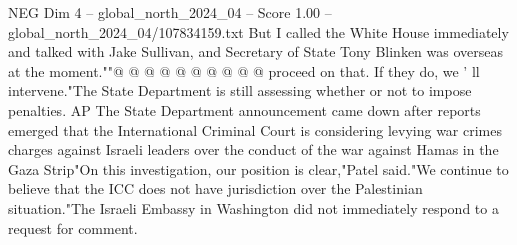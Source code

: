 \begin{textsample}{NEG Dim 4 – global\_north\_2024\_04 – Score 1.00 – global\_north\_2024\_04/107834159.txt}
But I called the White House immediately and talked with Jake Sullivan, and Secretary of State Tony Blinken was overseas at the moment.""@ @ @ @ @ @ @ @ @ @ proceed on that.
If they do, we ' ll intervene."The State Department is still assessing whether or not to impose penalties.
AP The State Department announcement came down after reports emerged that the International Criminal Court is considering levying war crimes charges against Israeli leaders over the conduct of the war against Hamas in the Gaza Strip"On this investigation, our position is clear,"Patel said."We continue to believe that the ICC does not have jurisdiction over the Palestinian situation."The Israeli Embassy in Washington did not immediately respond to a request for comment.

\end{textsample}
